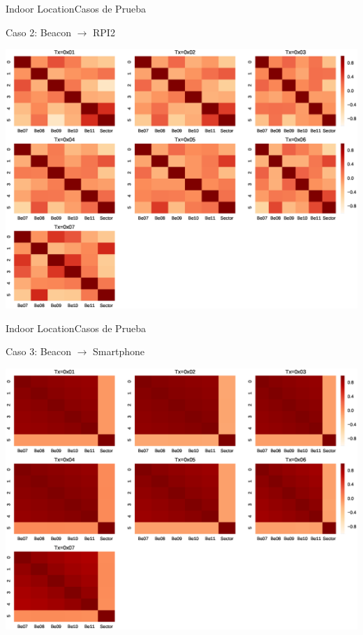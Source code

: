 \documentclass[10pt]{beamer}
\begin{document}
\begin{frame}{Indoor Location}{Casos de Prueba}
\begin{block}{Caso 2: Beacon $\rightarrow$ RPI2}
\begin{center}
\includegraphics[scale=0.3]{AAUgraphics/correlationRaspberry.eps}
\end{center}
\end{block}
\end{frame}

\begin{frame}{Indoor Location}{Casos de Prueba}
\begin{block}{Caso 3: Beacon $\rightarrow$ Smartphone}
\begin{center}
\includegraphics[scale=0.3]{AAUgraphics/correlationMoviles.eps}
\end{center}
\end{block}
\end{frame}
\end{document}
